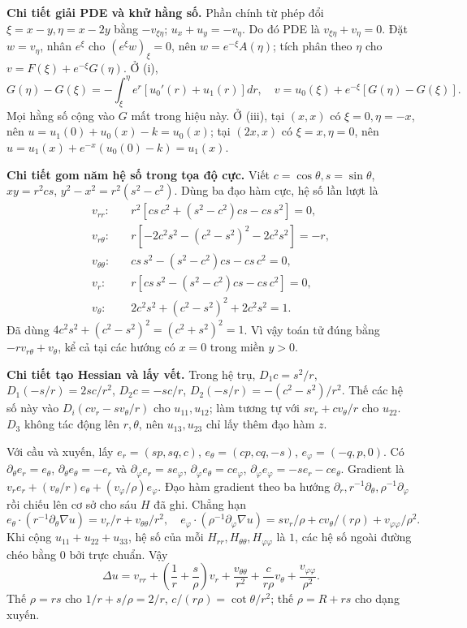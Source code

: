 \textbf{Chi tiết giải PDE và khử hằng số.} Phần chính từ phép đổi $\xi=x-y,\eta=x-2y$ bằng $-v_{\xi\eta}$; $u_x+u_y=-v_\eta$. Do đó PDE là $v_{\xi\eta}+v_\eta=0$. Đặt $w=v_\eta$, nhân $e^\xi$ cho $(e^\xi w)_\xi=0$, nên $w=e^{-\xi}A(\eta)$; tích phân theo $\eta$ cho $v=F(\xi)+e^{-\xi}G(\eta)$. Ở (i),
\[G(\eta)-G(\xi)=-\int_\xi^\eta e^r[u_0'(r)+u_1(r)]dr,\quad
v=u_0(\xi)+e^{-\xi}[G(\eta)-G(\xi)].\]
Mọi hằng số cộng vào $G$ mất trong hiệu này. Ở (iii), tại $(x,x)$ có $\xi=0,\eta=-x$, nên $u=u_1(0)+u_0(x)-k=u_0(x)$; tại $(2x,x)$ có $\xi=x,\eta=0$, nên $u=u_1(x)+e^{-x}(u_0(0)-k)=u_1(x)$.

\textbf{Chi tiết gom năm hệ số trong tọa độ cực.} Viết $c=\cos\theta,s=\sin\theta$, $xy=r^2cs$, $y^2-x^2=r^2(s^2-c^2)$. Dùng ba đạo hàm cực, hệ số lần lượt là
\[\begin{aligned}
v_{rr}:&\quad r^2[cs\,c^2+(s^2-c^2)cs-cs\,s^2]=0,\\
v_{r\theta}:&\quad r[-2c^2s^2-(c^2-s^2)^2-2c^2s^2]=-r,\\
v_{\theta\theta}:&\quad cs\,s^2-(s^2-c^2)cs-cs\,c^2=0,\\
v_r:&\quad r[cs\,s^2-(s^2-c^2)cs-cs\,c^2]=0,\\
v_\theta:&\quad 2c^2s^2+(c^2-s^2)^2+2c^2s^2=1.
\end{aligned}\]
Đã dùng $4c^2s^2+(c^2-s^2)^2=(c^2+s^2)^2=1$. Vì vậy toán tử đúng bằng $-rv_{r\theta}+v_\theta$, kể cả tại các hướng có $x=0$ trong miền $y>0$.

\textbf{Chi tiết tạo Hessian và lấy vết.} Trong hệ trụ, $D_1c=s^2/r$, $D_1(-s/r)=2sc/r^2$, $D_2c=-sc/r$, $D_2(-s/r)=-(c^2-s^2)/r^2$. Thế các hệ số này vào $D_i(cv_r-sv_\theta/r)$ cho $u_{11},u_{12}$; làm tương tự với $sv_r+cv_\theta/r$ cho $u_{22}$. $D_3$ không tác động lên $r,\theta$, nên $u_{13},u_{23}$ chỉ lấy thêm đạo hàm $z$.

Với cầu và xuyến, lấy $e_r=(sp,sq,c)$, $e_\theta=(cp,cq,-s)$, $e_\varphi=(-q,p,0)$. Có $\partial_\theta e_r=e_\theta$, $\partial_\theta e_\theta=-e_r$ và $\partial_\varphi e_r=s e_\varphi$, $\partial_\varphi e_\theta=c e_\varphi$, $\partial_\varphi e_\varphi=-s e_r-c e_\theta$. Gradient là $v_re_r+(v_\theta/r)e_\theta+(v_\varphi/\rho)e_\varphi$. Đạo hàm gradient theo ba hướng $\partial_r,r^{-1}\partial_\theta,\rho^{-1}\partial_\varphi$ rồi chiếu lên cơ sở cho sáu $H$ đã ghi. Chẳng hạn
\[e_\theta\cdot(r^{-1}\partial_\theta\nabla u)=v_r/r+v_{\theta\theta}/r^2,\quad
e_\varphi\cdot(\rho^{-1}\partial_\varphi\nabla u)
=sv_r/\rho+cv_\theta/(r\rho)+v_{\varphi\varphi}/\rho^2.\]
Khi cộng $u_{11}+u_{22}+u_{33}$, hệ số của mỗi $H_{rr},H_{\theta\theta},H_{\varphi\varphi}$ là $1$, các hệ số ngoài đường chéo bằng $0$ bởi trực chuẩn. Vậy
\[\Delta u=v_{rr}+\left(\frac1r+\frac s\rho\right)v_r+
\frac{v_{\theta\theta}}{r^2}+\frac c{r\rho}v_\theta+\frac{v_{\varphi\varphi}}{\rho^2}.\]
Thế $\rho=rs$ cho $1/r+s/\rho=2/r$, $c/(r\rho)=\cot\theta/r^2$; thế $\rho=R+rs$ cho dạng xuyến.

